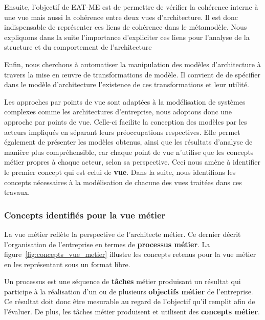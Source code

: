     Ensuite, l’objectif de EAT-ME est de permettre de vérifier la cohérence interne à une vue mais
    aussi la cohérence entre deux vues d'architecture. Il est donc indispensable de représenter
    ces liens de cohérence dans le métamodèle. Nous expliquons dans la suite l'importance
    d'expliciter ces liens pour l'analyse de la structure et du comportement de l'architecture

    Enfin, nous cherchons à automatiser la manipulation des modèles d'architecture à travers
    la mise en œuvre de transformations de modèle. Il convient de de spécifier dans le modèle
    d'architecture l’existence de ces transformations et leur utilité.

    Les approches par points de vue sont adaptées à la modélisation
    de systèmes complexes comme les architectures d'entreprise, nous adoptons donc une
    approche par points de vue. Celle-ci facilite la conception des modèles par les
    acteurs impliqués en séparant leurs préoccupations respectives. Elle permet
    également de présenter les modèles obtenus, ainsi que les résultats d'analyse 
    de manière plus compréhensible, car chaque point de vue
    n'utilise que les concepts métier propres à chaque acteur, selon sa perspective.
    Ceci nous amène à identifier le premier concept qui est celui de \textbf{vue}. 
    Dans la suite, nous identifions les concepts nécessaires à la modélisation de
    chacune des vues traitées dans ces travaux.



    \subsubsection{Concepts identifiés pour la vue métier}

    La vue métier reflète la perspective de l'architecte métier. Ce dernier
    décrit l’organisation de l'entreprise en termes de \textbf{processus métier}.
    La figure~\ref{fig:concepts_vue_metier} illustre les concepts retenus pour la vue
    métier en les représentant sous un format libre.

    Un processus est une séquence
    de \textbf{tâches} métier produisant un résultat qui
    participe à la réalisation d'un ou de plusieurs \textbf{objectifs métier} de l'entreprise.
    Ce résultat doit donc être mesurable au regard de l'objectif qu'il remplit afin de l'évaluer.
    De plus, les tâches métier produisent et utilisent des \textbf{concepts métier}.


